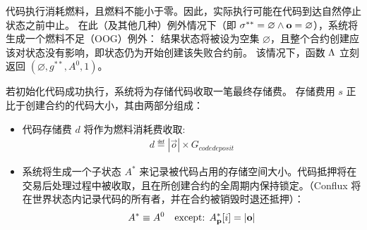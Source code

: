 代码执行消耗燃料，且燃料不能小于零。因此，实际执行可能在代码到达自然停止状态之前中止。
在此（及其他几种）例外情况下（即 $\mathbf{\sigma}^{**}=\varnothing \land \mathbf{o}=\varnothing$），系统将生成一个燃料不足（OOG）例外：
结果状态将被设为空集 $\varnothing$，且整个合约创建应该对状态没有影响，即状态仍为开始创建该失败合约前。
%
该情况下，函数 $\mathrm{\Lambda}$ 立刻返回 $(\varnothing,g^{**},A^0,1)$。


若初始化代码成功执行，系统将为存储代码收取一笔最终存储费。
存储费用 $s$ 正比于创建合约的代码大小，其由两部分组成：
\begin{itemize}
	\item 代码存储费 $d$ 将作为燃料消耗费收取:
	\begin{align}
		d \eqdef   |\vec{o}| \times G_{codedeposit}
	\end{align}

	\item 系统将生成一个子状态 $A^{*}$ 来记录被代码占用的存储空间大小。代码抵押将在交易后处理过程中被收取，且在所创建合约的全周期内保持锁定。（Conflux 将在世界状态内记录代码的所有者，并在合约被销毁时退还抵押）：
	\begin{align}
		A^{*} \equiv   A^0 \quad\mbox{except: }A^*_{\bf p}[i]=|\mathbf{o}|
	\end{align}
\end{itemize}

